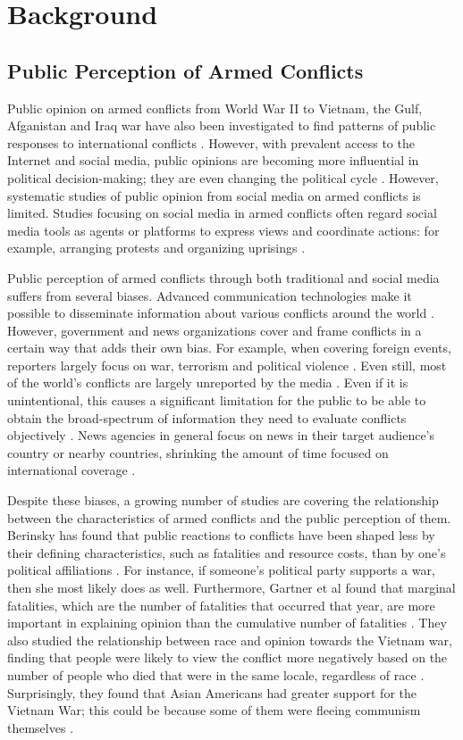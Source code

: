 \section{Background}
\subsection{Public Perception of Armed Conflicts}
Public opinion on armed conflicts from World War II to Vietnam, the Gulf, Afganistan and Iraq war have also been investigated to find patterns of public responses to international conflicts \cite{Berinsky2009}. However, with prevalent access to the Internet and social media, public opinions are becoming more influential in political decision-making; they are even changing the political cycle \cite{Shirky2011}. However, systematic studies of public opinion from social media on armed conflicts is limited. Studies focusing on social media in armed conflicts often regard social media tools as agents or platforms to express views and coordinate actions: for example, arranging protests and organizing uprisings \cite{Lim2012}.

Public perception of armed conflicts through both traditional and social media suffers from several biases. Advanced communication technologies make it possible to disseminate information about various conflicts around the world \cite{Sacco2015}. However, government and news organizations cover and frame conflicts in a certain way that adds their own bias. For example, when covering foreign events, reporters largely focus on war, terrorism and political violence \cite{Nossek2004}. Even still, most of the world's conflicts are largely unreported by the media \cite{Hawkins2011}. Even if it is unintentional, this causes a significant limitation for the public to be able to obtain the broad-spectrum of information they need to evaluate conflicts objectively \cite{Nelson1997}. News agencies in general focus on news in their target audience's country or nearby countries, shrinking the amount of time focused on international coverage \cite{Seib2004}.

Despite these biases, a growing number of studies are covering the relationship between the characteristics of armed conflicts and the public perception of them. Berinsky has found that public reactions to conflicts have been shaped less by their defining characteristics, such as fatalities and resource costs, than by one's political affiliations \cite{Berinsky2009}. For instance, if someone's political party supports a war, then she most likely does as well. Furthermore, Gartner et al found that marginal fatalities, which are the number of fatalities that occurred that year, are more important in explaining opinion than the cumulative number of fatalities \cite{Gartner1998}. They also studied the relationship between race and opinion towards the Vietnam war, finding that people were likely to view the conflict more negatively based on the number of people who died that were in the same locale, regardless of race \cite{Gartner2000}. Surprisingly, they found that Asian Americans had greater support for the Vietnam War; this could be because some of them were fleeing communism themselves \cite{Gartner2000}. 

